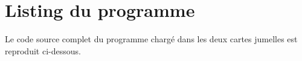 \section{Listing du programme}
\label{app:code}

Le code source complet du programme chargé dans les deux cartes jumelles est
reproduit ci-dessous.


